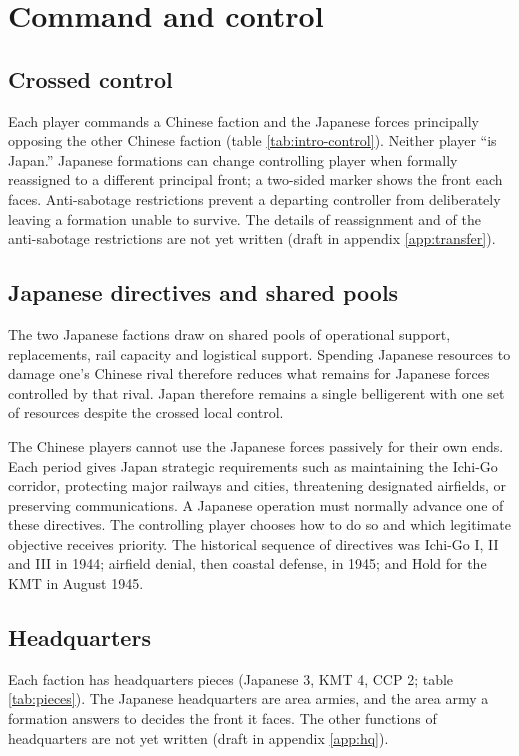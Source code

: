\documentclass[11pt]{article}
\begin{document}
\section{Command and control}\label{sec:command}
\subsection{Crossed control}\label{sub:crossed}
Each player commands a Chinese faction and the Japanese forces principally opposing the other Chinese faction (table \ref{tab:intro-control}). Neither player ``is Japan.'' Japanese formations can change controlling player when formally reassigned to a different principal front; a two-sided marker shows the front each faces. Anti-sabotage restrictions prevent a departing controller from deliberately leaving a formation unable to survive. The details of reassignment and of the anti-sabotage restrictions are not yet written (draft in appendix \ref{app:transfer}).

\subsection{Japanese directives and shared pools}\label{sub:directives}
The two Japanese factions draw on shared pools of operational support, replacements, rail capacity and logistical support. Spending Japanese resources to damage one's Chinese rival therefore reduces what remains for Japanese forces controlled by that rival. Japan therefore remains a single belligerent with one set of resources despite the crossed local control.

The Chinese players cannot use the Japanese forces passively for their own ends. Each period gives Japan strategic requirements such as maintaining the Ichi-Go corridor, protecting major railways and cities, threatening designated airfields, or preserving communications. A Japanese operation must normally advance one of these directives. The controlling player chooses how to do so and which legitimate objective receives priority. The historical sequence of directives was Ichi-Go I, II and III in 1944; airfield denial, then coastal defense, in 1945; and Hold for the KMT in August 1945.

\subsection{Headquarters}
Each faction has headquarters pieces (Japanese 3, KMT 4, CCP 2; table \ref{tab:pieces}). The Japanese headquarters are area armies, and the area army a formation answers to decides the front it faces. The other functions of headquarters are not yet written (draft in appendix \ref{app:hq}).
\end{document}
